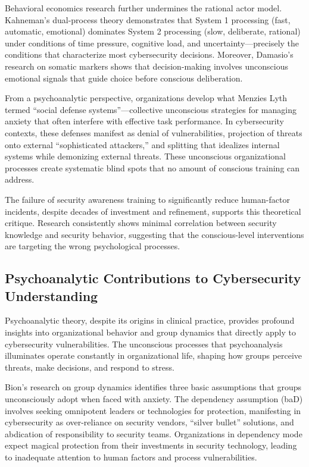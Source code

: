 \documentclass[11pt,a4paper]{article}
\begin{document}
Behavioral economics research further undermines the rational actor model. Kahneman's dual-process theory demonstrates that System 1 processing (fast, automatic, emotional) dominates System 2 processing (slow, deliberate, rational) under conditions of time pressure, cognitive load, and uncertainty\cite{kahneman2011}—precisely the conditions that characterize most cybersecurity decisions. Moreover, Damasio's research on somatic markers shows that decision-making involves unconscious emotional signals that guide choice before conscious deliberation\cite{damasio1994}.

From a psychoanalytic perspective, organizations develop what Menzies Lyth termed ``social defense systems''—collective unconscious strategies for managing anxiety that often interfere with effective task performance\cite{menzies1960}. In cybersecurity contexts, these defenses manifest as denial of vulnerabilities, projection of threats onto external ``sophisticated attackers,'' and splitting that idealizes internal systems while demonizing external threats. These unconscious organizational processes create systematic blind spots that no amount of conscious training can address.

The failure of security awareness training to significantly reduce human-factor incidents, despite decades of investment and refinement, supports this theoretical critique. Research consistently shows minimal correlation between security knowledge and security behavior\cite{beautement2008}, suggesting that the conscious-level interventions are targeting the wrong psychological processes.

\subsection{Psychoanalytic Contributions to Cybersecurity Understanding}

Psychoanalytic theory, despite its origins in clinical practice, provides profound insights into organizational behavior and group dynamics that directly apply to cybersecurity vulnerabilities. The unconscious processes that psychoanalysis illuminates operate constantly in organizational life, shaping how groups perceive threats, make decisions, and respond to stress.

Bion's research on group dynamics identifies three basic assumptions that groups unconsciously adopt when faced with anxiety\cite{bion1961}. The dependency assumption (baD) involves seeking omnipotent leaders or technologies for protection, manifesting in cybersecurity as over-reliance on security vendors, ``silver bullet'' solutions, and abdication of responsibility to security teams. Organizations in dependency mode expect magical protection from their investments in security technology, leading to inadequate attention to human factors and process vulnerabilities.
\end{document}
